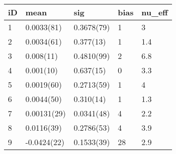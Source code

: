 
\begin{tabular}{l|l|l|l|l}
\hline
iD & mean & sig & bias & nu\_eff\\
\hline
1 & 0.0033(81) & 0.3678(79) & 1 & 3\\
\hline
2 & 0.0034(61) & 0.377(13) & 1 & 1.4\\
\hline
3 & 0.008(11) & 0.4810(99) & 2 & 6.8\\
\hline
4 & 0.001(10) & 0.637(15) & 0 & 3.3\\
\hline
5 & 0.0019(60) & 0.2713(59) & 1 & 4\\
\hline
6 & 0.0044(50) & 0.310(14) & 1 & 1.3\\
\hline
7 & 0.00131(29) & 0.0341(48) & 4 & 2.2\\
\hline
8 & 0.0116(39) & 0.2786(53) & 4 & 3.9\\
\hline
9 & -0.0424(22) & 0.1533(39) & 28 & 2.9\\
\hline
\end{tabular}
